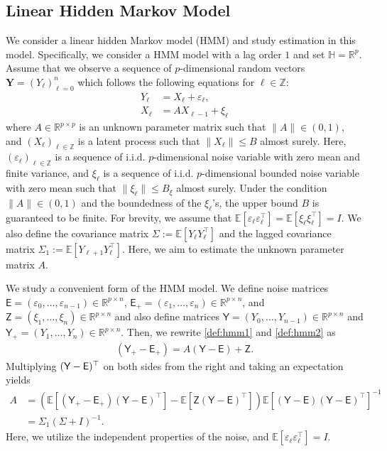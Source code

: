 \documentclass[11pt,a4paper]{article}
\theoremstyle{remark}
\theoremstyle{definition}
\theoremstyle{definition}
\newcommand{\Ep}{\mathbb{E}}
\newcommand{\rc}{\color{black}}
\begin{document}
\begin{bibunit}[apalike]
\subsection{Linear Hidden Markov Model}
We consider a linear hidden Markov model (HMM) and study estimation in this model.
Specifically, we consider a HMM model with a lag order $1$ and set $\mathbb{H} = \mathbb{R}^{p}$.
Assume that we observe a sequence of $p$-dimensional random vectors $ \mathbf{Y} = (Y_\ell)_{\ell=0}^n$ which follows the following equations for $\ell \in \mathbb{Z}$:
\begin{align}
    Y_{\ell} &= X_{\ell} + \varepsilon_\ell,  \label{def:hmm1}\\
    X_{\ell} &= A X_{\ell - 1} + \xi_\ell \label{def:hmm2}
\end{align}
where $A \in \mathbb{R}^{p \times p}$ is an unknown parameter matrix such that $\|A\| \in (0,1)$, and $(X_\ell)_{\ell \in \mathbb{Z}}$ is a latent process such that $\|X_\ell\| \leq B$ almost surely.
Here, $(\varepsilon_\ell)_{\ell \in \mathbb{Z}}$ is a sequence of i.i.d. $p$-dimensional noise variable with zero mean and finite variance, and $\xi_\ell$ is a sequence of  i.i.d. $p$-dimensional bounded noise variable with zero mean such that $\|\xi_\ell\| \leq B_\xi$ almost surely.
Under the condition $\|A\| \in (0,1)$ and the boundedness of the $\xi_\ell$'s, the upper bound $B$ is guaranteed to be finite.
For brevity, we assume that $\Ep[\varepsilon_\ell \varepsilon_\ell^\top] = \Ep[\xi_\ell \xi_\ell^\top] = I$.
We also define the covariance matrix $\Sigma:= \Ep[Y_\ell Y_\ell^\top]$ and the lagged covariance matrix $\Sigma_1:= \Ep[Y_{\ell + 1} Y_\ell^\top]$.
Here, we aim to estimate the unknown parameter matrix $A$.


We study a convenient form of the HMM model.
We define noise matrices $\mathsf{E} = (\varepsilon_0,\ldots,\varepsilon_{n-1}) \in \mathbb{R}^{p \times n}$, $\mathsf{E}_+ = (\varepsilon_1,\ldots,\varepsilon_n) \in \mathbb{R}^{p \times n}$, and $\mathsf{Z} = (\xi_1,\ldots,\xi_n) \in \mathbb{R}^{p \times n}$ and also define matrices $\mathsf{Y} = (Y_0,\ldots,Y_{n-1}) \in \mathbb{R}^{p \times n}$ and $\mathsf{Y}_+ = (Y_1,\ldots,Y_{n}) \in \mathbb{R}^{p \times n}$.
Then, we rewrite \eqref{def:hmm1} and \eqref{def:hmm2} as
\begin{align*}
    (\mathsf{Y}_+ - \mathsf{E}_+) = A (\mathsf{Y} - \mathsf{E}) + \mathsf{Z}.
\end{align*}
Multiplying $(\mathsf{Y} - \mathsf{\rc E})^\top$ on both sides from the right and taking an expectation yields
\begin{align*}
    A &= (\Ep[(\mathsf{Y}_+ - \mathsf{E}_+) (\mathsf{Y} - \mathsf{E})^\top] - \Ep[\mathsf{Z} (\mathsf{Y} - \mathsf{E})^\top]) \Ep[(\mathsf{Y} - \mathsf{E}) (\mathsf{Y} - \mathsf{E})^\top]^{-1}\\
    &= \Sigma_{1} (\Sigma + I)^{-1}.
\end{align*}
Here, we utilize the independent properties of the noise, and $\Ep[\varepsilon_\ell \varepsilon_\ell^\top]=I$.



\end{bibunit}
\end{document}
